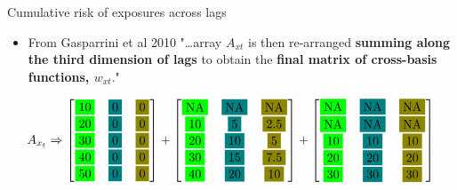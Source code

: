 \documentclass[english]{beamer}
\newcommand{\alertblue}[1]{{\color{blue}#1}}
\begin{document}
\begin{frame}{Cumulative risk of exposures across lags}
\begin{itemize}
    \item From Gasparrini et al 2010 "\ldots array \alertblue{\(A_{xt}\)} is then re-arranged \textbf{\alertblue{summing along the third dimension of lags}} to obtain the \alertblue{\textbf{final matrix of cross-basis functions, \(w_{xt}\)}}." 
\end{itemize}
\vspace{0.3cm}
\[
A_{x_t}
\Rightarrow 
\begin{bmatrix}
\fcolorbox{white}{green}{10} & \fcolorbox{white}{teal}{0} & \fcolorbox{white}{olive}{0} \\
\fcolorbox{white}{green}{20} & \fcolorbox{white}{teal}{0} & \fcolorbox{white}{olive}{0} \\
\fcolorbox{white}{green}{30} & \fcolorbox{white}{teal}{0} & \fcolorbox{white}{olive}{0} \\
\fcolorbox{white}{green}{40} & \fcolorbox{white}{teal}{0} & \fcolorbox{white}{olive}{0} \\ 
\fcolorbox{white}{green}{50} & \fcolorbox{white}{teal}{0} & \fcolorbox{white}{olive}{0}
\end{bmatrix} +
\begin{bmatrix}
\fcolorbox{white}{green}{NA} & \fcolorbox{white}{teal}{NA} & \fcolorbox{white}{olive}{NA} \\ 
\fcolorbox{white}{green}{10} & \fcolorbox{white}{teal}{5} & \fcolorbox{white}{olive}{2.5} \\
\fcolorbox{white}{green}{20} & \fcolorbox{white}{teal}{10} & \fcolorbox{white}{olive}{5} \\
\fcolorbox{white}{green}{30} & \fcolorbox{white}{teal}{15} & \fcolorbox{white}{olive}{7.5} \\
\fcolorbox{white}{green}{40} & \fcolorbox{white}{teal}{20} & \fcolorbox{white}{olive}{10}
\end{bmatrix} +
\begin{bmatrix}
\fcolorbox{white}{green}{NA} & \fcolorbox{white}{teal}{NA} & \fcolorbox{white}{olive}{NA} \\
\fcolorbox{white}{green}{NA} & \fcolorbox{white}{teal}{NA} & \fcolorbox{white}{olive}{NA} \\
\fcolorbox{white}{green}{10} & \fcolorbox{white}{teal}{10} & \fcolorbox{white}{olive}{10} \\
\fcolorbox{white}{green}{20} & \fcolorbox{white}{teal}{20} & \fcolorbox{white}{olive}{20} \\
\fcolorbox{white}{green}{30} & \fcolorbox{white}{teal}{30} & \fcolorbox{white}{olive}{30} 
\end{bmatrix}
\]


\end{frame}
\end{document}
